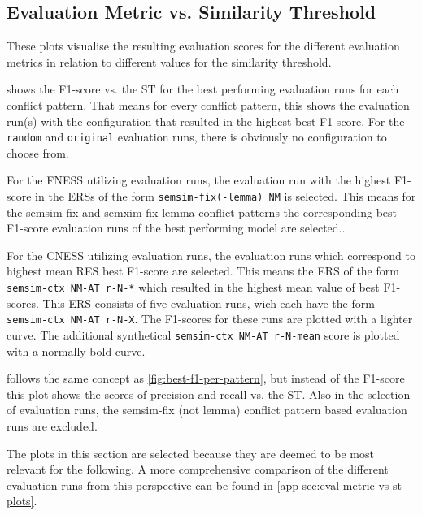 \documentclass[11pt]{scrreprt}
\begin{document}
\subsection{Evaluation Metric vs. Similarity Threshold}
\label{sec:eval-metrics-vs-st}

These plots visualise the resulting evaluation scores for the different evaluation metrics in relation to different values for the similarity threshold. 

 shows the F1-score vs. the ST for the best performing evaluation runs for each conflict pattern. That means for every conflict pattern, this shows the evaluation run(s) with the configuration that resulted in the highest best F1-score. For the \texttt{random} and \texttt{original} evaluation runs, there is obviously no configuration to choose from. 

For the FNESS utilizing evaluation runs, the evaluation run with the highest F1-score in the ERSs of the form \texttt{semsim-fix(-lemma) NM} is selected. This means for the semsim-fix and semxim-fix-lemma conflict patterns the corresponding best F1-score evaluation runs of the best performing model are selected..

For the CNESS utilizing evaluation runs, the evaluation runs which correspond to highest mean RES best F1-score are selected. This means the ERS of the form \texttt{semsim-ctx NM-AT r-N-*} which resulted in the highest mean value of best F1-scores. This ERS consists of five evaluation runs, wich each have the form \texttt{semsim-ctx NM-AT r-N-X}. The F1-scores for these runs are plotted with a lighter curve. The additional synthetical \texttt{semsim-ctx NM-AT r-N-mean} score is plotted with a normally bold curve. 


 follows the same concept as \cref{fig:best-f1-per-pattern}, but instead of the F1-score this plot shows the scores of precision and recall vs. the ST. Also in the selection of evaluation runs, the semsim-fix (not lemma) conflict pattern based evaluation runs are excluded.

The plots in this section are selected because they are deemed to be most relevant for the following. A more comprehensive comparison of the different evaluation runs from this perspective can be found in \cref{app-sec:eval-metric-vs-st-plots}.
\end{document}
